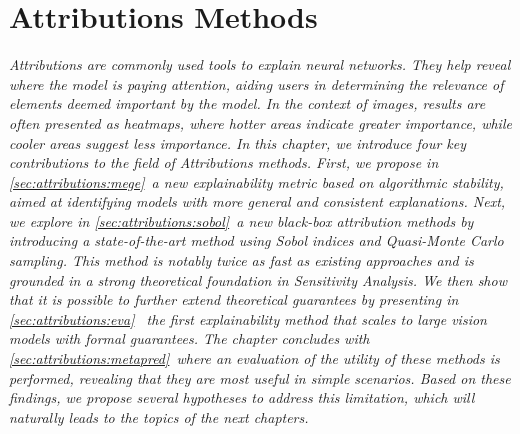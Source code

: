 \chapter{Attributions Methods}
\label{chap:attributions}

\begin{chapterabstract}
\textit{
Attributions are commonly used tools to explain neural networks. They help reveal where the model is paying attention, aiding users in determining the relevance of elements deemed important by the model. In the context of images, results are often presented as heatmaps, where hotter areas indicate greater importance, while cooler areas suggest less importance.
In this chapter, we introduce four key contributions to the field of Attributions methods. First, we propose in \autoref{sec:attributions:mege}~a new explainability metric based on algorithmic stability, aimed at identifying models with more general and consistent explanations. Next, we explore in \autoref{sec:attributions:sobol}~a new black-box attribution methods by introducing a state-of-the-art method using Sobol indices and Quasi-Monte Carlo sampling. This method is notably twice as fast as existing approaches and is grounded in a strong theoretical foundation in Sensitivity Analysis. We then show that it is possible to further extend theoretical guarantees by presenting in \autoref{sec:attributions:eva}~ the first explainability method that scales to large vision models with formal guarantees. The chapter concludes with \autoref{sec:attributions:metapred}~where an evaluation of the utility of these methods is performed, revealing that they are most useful in simple scenarios. Based on these findings, we propose several hypotheses to address this limitation, which will naturally leads to the topics of the next chapters.
}
\end{chapterabstract}

